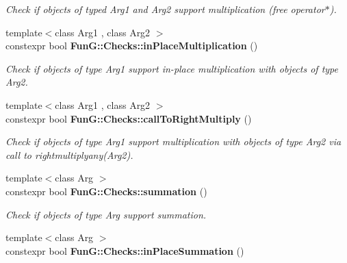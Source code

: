 \begin{DoxyCompactItemize}
\begin{DoxyCompactList}\small\item\em Check if objects of typed Arg1 and Arg2 support multiplication (free operator$\ast$). \end{DoxyCompactList}\item 
\hypertarget{namespaceFunG_1_1Checks_abeeb72e6dc640672187145a0469da9cc}{{\footnotesize template$<$class Arg1 , class Arg2 $>$ }\\constexpr bool {\bfseries Fun\-G\-::\-Checks\-::in\-Place\-Multiplication} ()}\label{namespaceFunG_1_1Checks_abeeb72e6dc640672187145a0469da9cc}

\begin{DoxyCompactList}\small\item\em Check if objects of type Arg1 support in-\/place multiplication with objects of type Arg2. \end{DoxyCompactList}\item 
\hypertarget{namespaceFunG_1_1Checks_a3874c9f52b64baa8ed9a87b9902eb54c}{{\footnotesize template$<$class Arg1 , class Arg2 $>$ }\\constexpr bool {\bfseries Fun\-G\-::\-Checks\-::call\-To\-Right\-Multiply} ()}\label{namespaceFunG_1_1Checks_a3874c9f52b64baa8ed9a87b9902eb54c}

\begin{DoxyCompactList}\small\item\em Check if objects of type Arg1 support multiplication with objects of type Arg2 via call to rightmultiplyany(\-Arg2). \end{DoxyCompactList}\item 
\hypertarget{namespaceFunG_1_1Checks_a2dd2bf4016317339c1a609ddda1f4915}{{\footnotesize template$<$class Arg $>$ }\\constexpr bool {\bfseries Fun\-G\-::\-Checks\-::summation} ()}\label{namespaceFunG_1_1Checks_a2dd2bf4016317339c1a609ddda1f4915}

\begin{DoxyCompactList}\small\item\em Check if objects of type Arg support summation. \end{DoxyCompactList}\item 
\hypertarget{namespaceFunG_1_1Checks_a9ff694f025cc9f2ff379b1f3833641bb}{{\footnotesize template$<$class Arg $>$ }\\constexpr bool {\bfseries Fun\-G\-::\-Checks\-::in\-Place\-Summation} ()}\label{namespaceFunG_1_1Checks_a9ff694f025cc9f2ff379b1f3833641bb}


\end{DoxyCompactItemize}
